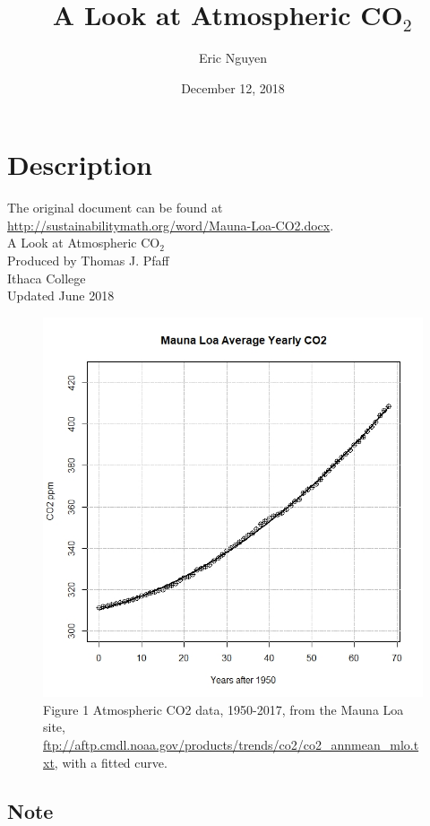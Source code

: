 \documentclass[11pt]{article}
\author{Eric Nguyen}
\date{December 12, 2018}
\title{A Look at Atmospheric CO\(_{\text{2}}\)}
\begin{document}
\maketitle
\tableofcontents


\section{Description}
\label{sec:org91827ea}

The original document can be found at
\url{http://sustainabilitymath.org/word/Mauna-Loa-CO2.docx}. \\

\noindent A Look at Atmospheric CO\(_{\text{2}}\) \\
Produced by Thomas J. Pfaff \\
Ithaca College \\
Updated June 2018 \\

\begin{figure}[htbp]
\centering
\includegraphics[width=.9\linewidth]{./figures/figure-01.jpg}
\caption{\label{fig:org6bd9d10}
Figure 1 Atmospheric CO2 data, 1950-2017, from the Mauna Loa site, \url{ftp://aftp.cmdl.noaa.gov/products/trends/co2/co2\_annmean\_mlo.txt}, with a fitted curve.}
\end{figure}

\subsection{Note}
\label{sec:org12b3cff}
\end{document}
